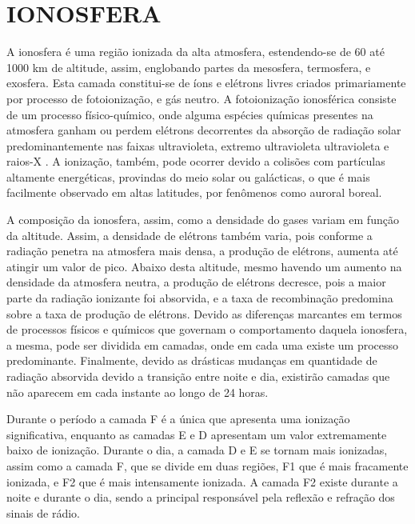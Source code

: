 \chapter{IONOSFERA}

A ionosfera é uma região ionizada da alta atmosfera, estendendo-se de 60 até 1000 km de altitude, assim, englobando partes da mesosfera, termosfera, e exosfera. Esta camada constitui-se de íons e elétrons livres criados primariamente por processo de fotoionização, e gás neutro. A fotoionização ionosférica consiste de um processo físico-químico, onde alguma espécies químicas presentes na atmosfera ganham ou perdem elétrons decorrentes da absorção de radiação solar predominantemente nas faixas ultravioleta, extremo ultravioleta ultravioleta e raios-X \cite{RISNBETH:1969, NEGRETI:2012}. A ionização, também, pode ocorrer devido a colisões com partículas altamente energéticas, provindas do meio solar ou galácticas, o que é mais facilmente observado em altas latitudes, por fenômenos como auroral boreal.

A composição da ionosfera, assim, como a densidade do gases variam em função da altitude. Assim, a densidade de elétrons também varia, pois conforme a radiação penetra na atmosfera mais densa, a produção de elétrons, aumenta até atingir um valor de pico. Abaixo desta altitude, mesmo havendo um aumento na densidade da atmosfera neutra, a produção de elétrons decresce, pois a maior parte da radiação ionizante foi absorvida, e a taxa de recombinação predomina sobre a taxa de produção de elétrons. Devido as diferenças marcantes em termos de processos físicos e químicos que governam o comportamento daquela ionosfera, a mesma, pode ser dividida em camadas, onde em cada uma existe um processo predominante. Finalmente, devido as drásticas mudanças em quantidade de radiação absorvida devido a transição entre noite e dia, existirão camadas que não aparecem em cada instante ao longo de 24 horas.

Durante o período a camada F é a única que apresenta uma ionização significativa, enquanto as camadas E e D apresentam um valor extremamente baixo de ionização. Durante o dia, a camada D e E se tornam mais ionizadas, assim como a camada F, que se divide em duas regiões, F1 que é mais fracamente ionizada, e F2 que é mais intensamente ionizada. A camada F2 existe durante a noite e durante o dia, sendo a principal responsável pela reflexão e refração dos sinais de rádio.

